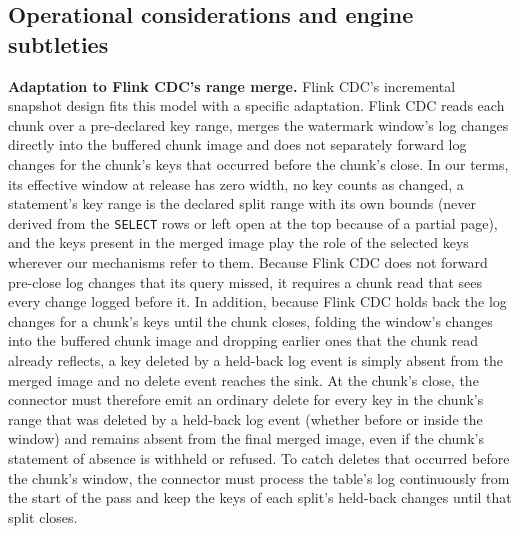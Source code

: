 \documentclass[sigconf,nonacm,10pt]{acmart}
\begin{document}
\subsection{Operational considerations and engine subtleties}\label{sec:subtleties}

\textbf{Adaptation to Flink CDC's range merge.} Flink CDC's incremental snapshot
design fits this model with a specific adaptation. Flink CDC reads each chunk
over a pre-declared key range, merges the watermark window's log changes
directly into the buffered chunk image and does not separately forward log
changes for the chunk's keys that occurred before the chunk's close. In our
terms, its effective window at release has zero width, no key counts as changed,
a statement's key range is the declared split range with its own bounds (never
derived from the \texttt{SELECT} rows or left open at the top because of a
partial page), and the keys present in the merged image play the role of the
selected keys wherever our mechanisms refer to them. Because Flink CDC does not
forward pre-close log changes that its query missed, it requires a chunk read
that sees every change logged before it. In addition, because Flink CDC holds back the log changes for a chunk's keys
until the chunk closes, folding the window's changes into the buffered chunk
image and dropping earlier ones that the chunk read already reflects, a key
deleted by a held-back log event is simply absent from the merged image and
no delete event reaches the sink. At the chunk's close, the connector must therefore emit an ordinary
delete for every key in the chunk's range that was deleted by a held-back log
event (whether before or inside the window) and remains absent from the final
merged image, even if the chunk's statement of absence is withheld or refused.
To catch deletes that occurred before the chunk's window, the connector must
process the table's log continuously from the start of the pass and keep the
keys of each split's held-back changes until that split closes.
\end{document}
